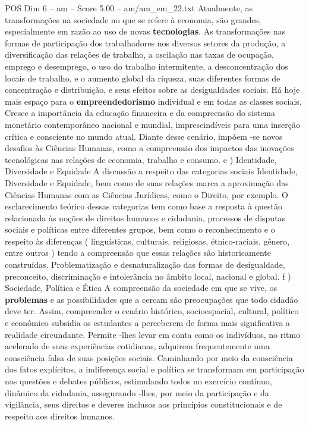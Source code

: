 \begin{textsample}{POS Dim 6 – am – Score 5.00 – am/am\_em\_22.txt}
Atualmente, as transformações na sociedade no que se refere à economia, são grandes, especialmente em razão ao uso de novas \textbf{tecnologias}.
As transformações nas formas de participação dos trabalhadores nos diversos setores da produção, a diversificação das relações de trabalho, a oscilação nas taxas de ocupação, emprego e desemprego, o uso do trabalho intermitente, a desconcentração dos locais de trabalho, e o aumento global da riqueza, suas diferentes formas de concentração e distribuição, e seus efeitos sobre as desigualdades sociais.
Há hoje mais espaço para o \textbf{empreendedorismo} individual e em todas as classes sociais.
Cresce a importância da educação financeira e da compreensão do sistema monetário contemporâneo nacional e mundial, imprescindíveis para uma inserção crítica e consciente no mundo atual.
Diante desse cenário, impõem -se novos desafios às Ciências Humanas, como a compreensão dos impactos das inovações tecnológicas nas relações de economia, trabalho e consumo. e ) Identidade, Diversidade e Equidade A discussão a respeito das categorias sociais Identidade, Diversidade e Equidade, bem como de suas relações marca a aproximação das Ciências Humanas com as Ciências Jurídicas, como o Direito, por exemplo.
O esclarecimento teórico dessas categorias tem como base a resposta à questão relacionada às noções de direitos humanos e cidadania, processos de disputas sociais e políticas entre diferentes grupos, bem como o reconhecimento e o respeito às diferenças ( linguísticas, culturais, religiosas, étnico-raciais, gênero, entre outros ) tendo a compreensão que essas relações são historicamente construídas.
Problematização e desnaturalização das formas de desigualdade, preconceito, discriminação e intolerância no âmbito local, nacional e global. f ) Sociedade, Política e Ética A compreensão da sociedade em que se vive, os \textbf{problemas} e as possibilidades que a cercam são preocupações que todo cidadão deve ter.
Assim, compreender o cenário histórico, socioespacial, cultural, político e econômico subsidia os estudantes a perceberem de forma mais significativa a realidade circundante.
Permite -lhes levar em conta como os indivíduos, no ritmo acelerado de suas experiências cotidianas, adquirem frequentemente uma consciência falsa de suas posições sociais.
Caminhando por meio da consciência dos fatos explícitos, a indiferença social e política se transformam em participação nas questões e debates públicos, estimulando todos no exercício contínuo, dinâmico da cidadania, assegurando -lhes, por meio da participação e da vigilância, seus direitos e deveres inclusos aos princípios constitucionais e de respeito aos direitos humanos.

\end{textsample}
